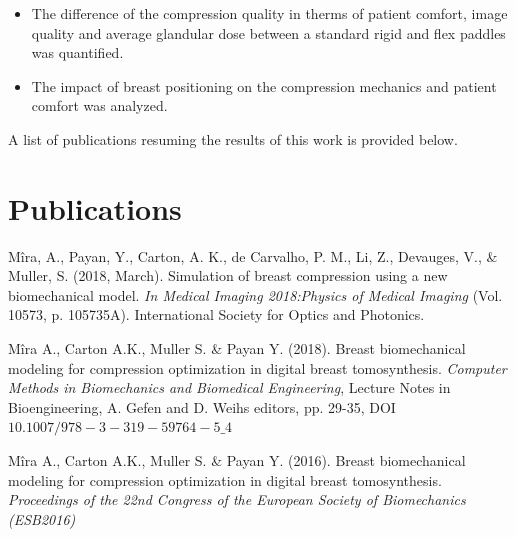 \begin{itemize}
\item The difference of the compression quality in therms of patient comfort, image quality and average glandular dose between a standard rigid and flex paddles was quantified.
\item The impact of breast positioning on the compression mechanics and patient comfort was analyzed. 
\end{itemize}
A list of publications resuming the results of this work is provided below.
\cleardoublepage
 
\chapter*{Publications}\label{section:publications}

\begin{description}

\item  Mîra, A., Payan, Y., Carton, A. K., de Carvalho, P. M., Li, Z., Devauges, V., \& Muller, S. (2018, March). Simulation of breast compression using a new biomechanical model. \textit {In Medical Imaging 2018:Physics of Medical Imaging} (Vol. 10573, p. 105735A). International Society for Optics and Photonics. \\

\item  Mîra A., Carton A.K., Muller S. \& Payan Y. (2018). Breast biomechanical modeling for compression optimization in digital breast tomosynthesis. \textit{Computer Methods in Biomechanics and Biomedical Engineering}, Lecture Notes in Bioengineering, A. Gefen and D. Weihs editors, pp. 29-35, DOI $10.1007/978-3-319-59764-5\_4$ \\

\item  Mîra A., Carton A.K., Muller S. \& Payan Y. (2016). Breast biomechanical modeling for compression optimization in digital breast tomosynthesis. \textit{Proceedings of the 22nd Congress of the European Society of Biomechanics (ESB2016)}
\end{description}

\cleardoublepage